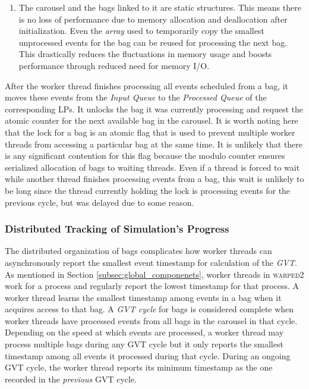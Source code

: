\documentclass[11pt]{book}
\begin{document}
\begin{enumerate}
\item The carousel and the bags linked to it are static structures.  This means there is no loss of
  performance due to memory allocation and deallocation after initialization.  Even the \emph{array} used to
  temporarily copy the smallest unprocessed events for the bag can be reused for processing the next bag.  This
  drastically reduces the fluctuations in memory usage and boosts performance through reduced need for memory
  I/O.

\end{enumerate}

After the worker thread finishes processing all events scheduled from a bag, it moves these events from the
\emph{Input Queue} to the \emph{Processed Queue} of the corresponding LPs.  It unlocks the bag it was
currently processing and request the atomic counter for the next available bag in the carousel.  It is worth
noting here that the lock for a bag is an atomic flag that is used to prevent multiple worker threads from
accessing a particular bag at the same time.  It is unlikely that there is any significant contention for this
flag because the modulo counter ensures serialized allocation of bags to waiting threads.  Even if a thread is
forced to wait while another thread finishes processing events from a bag, this wait is unlikely to be long
since the thread currently holding the lock is processing events for the previous cycle, but was delayed due
to some reason.

\subsubsection{Distributed Tracking of Simulation's Progress}\label{subsubsec:distributed_time}

The distributed organization of bags complicates how worker threads can asynchronously report the smallest
event timestamp for calculation of the \emph{GVT}.  As mentioned in Section \ref{subsec:global_componenets},
worker threads in \textsc{warped2} work for a process and regularly report the lowest timestamp for that
process.  A worker thread learns the smallest timestamp among events in a bag when it acquires access to that
bag.  A \emph{GVT cycle} for bags is considered complete when worker threads have processed events from all
bags in the carousel in that cycle.  Depending on the speed at which events are processed, a worker thread may
process multiple bags during any GVT cycle but it only reports the smallest timestamp among all events it
processed during that cycle.  During an ongoing GVT cycle, the worker thread reports its minimum timestamp as
the one recorded in the \emph{previous} GVT cycle.
\end{document}
